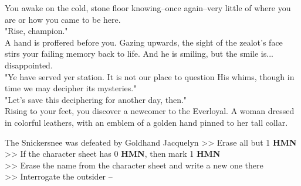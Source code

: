 You awake on the cold, stone floor knowing--once again--very little of where you are or how you came to be here.\\

"Rise, champion."\\

A hand is proffered before you. Gazing upwards, the sight of the zealot's face stirs your failing memory back to life. And he is smiling, but the smile is... disappointed.\\

"Ye have served yer station. It is not our place to question His whims, though in time we may decipher its mysteries."\\

"Let's save this deciphering for another day, then."\\

Rising to your feet, you discover a newcomer to the Everloyal. A woman dressed in colorful leathers, with an emblem of a golden hand pinned to her tall collar.

 The Snickersnee was defeated by Goldhand Jacquelyn
>> Erase all but 1 \textbf{HMN}\\
>> If the character sheet has 0 \textbf{HMN}, then mark 1 \textbf{HMN}\\
>> Erase the name from the character sheet and write a new one there\\

>> Interrogate the outsider -- 